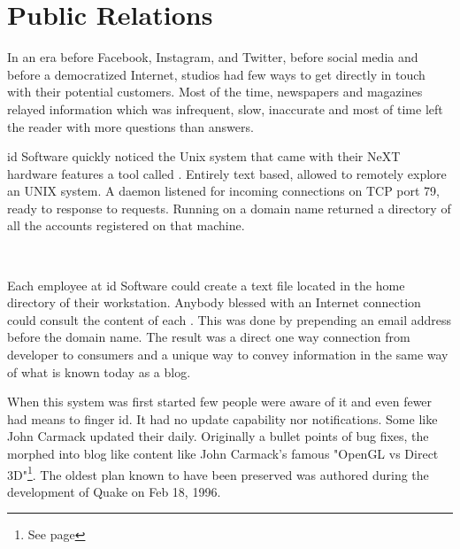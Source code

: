 \section{Public Relations}
In an era before Facebook, Instagram, and Twitter, before social media and before a democratized Internet, studios had few ways to get directly in touch with their potential customers. Most of the time, newspapers and magazines relayed information which was infrequent, slow, inaccurate and most of time left the reader with more questions than answers.


id Software quickly noticed the Unix system that came with their NeXT hardware features a tool called . Entirely text based,  allowed to remotely explore an UNIX system. A  daemon listened for incoming connections on TCP port 79, ready to response to requests. Running  on a domain name returned a directory of all the accounts registered on that machine.\\
\par
{}
\par
{}\\
\par

Each employee at id Software could create a  text file located in the home directory of their \NeXT workstation. Anybody blessed with an Internet connection could consult the content of each . This was done by prepending an email address before the domain name. The result was a direct one way connection from developer to consumers and a unique way to convey information in the same way of what is known today as a blog.\\
\par
When this system was first started few people were aware of it and even fewer had means to finger id. It had no update capability nor notifications. Some like John Carmack updated their  daily. Originally a bullet points of bug fixes, the  morphed into blog like content like John Carmack's famous "OpenGL vs Direct 3D"\footnote{See page \pageref{openglvsdirectd}}. The oldest plan known to have been preserved was authored during the development of Quake on Feb 18, 1996.



